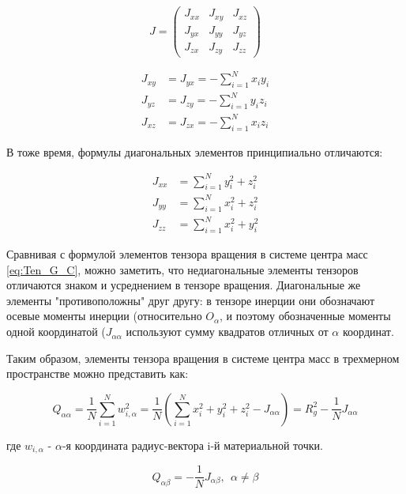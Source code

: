 \begin{equation}
\label{eq:Ten_I_J}
    J = \left(
    \begin{array}{ccc}
        J_{xx} & J_{xy} & J_{xz}  \\
        J_{yx} & J_{yy} & J_{yz} \\
        J_{zx} & J_{zy} & J_{zz}
    \end{array} \right)
\end{equation}

\begin{align}
    J_{xy} &= J_{yx} = -\sum_{i=1}^{N} x_{i} y_{i} \\
    J_{yz} &= J_{zy} = -\sum_{i=1}^{N} y_{i} z_{i} \\
    J_{xz} &= J_{zx} = -\sum_{i=1}^{N} x_{i} z_{i} 
\end{align}

В тоже время, формулы диагональных элементов принципиально отличаются:

\begin{align}
    J_{xx} &= \sum_{i=1}^{N} y_{i}^{2} + z_{i}^{2} \\
    J_{yy} &= \sum_{i=1}^{N} x_{i}^{2} + z_{i}^{2} \\
    J_{zz} &= \sum_{i=1}^{N} x_{i}^{2} + y_{i}^{2}
\end{align}

Сравнивая с формулой элементов тензора вращения в системе центра масс \eqref{eq:Ten_G_C}, можно заметить, что недиагональные элементы тензоров отличаются знаком и усреднением в тензоре вращения. Диагональные же элементы "противоположны" друг другу:
в тензоре инерции они обозначают осевые моменты инерции (относительно $O_{\alpha}$, и поэтому обозначенные моменты одной координатой ($J_{\alpha\alpha}$ используют сумму квадратов отличных от $\alpha$ координат.

Таким образом, элементы тензора вращения в системе центра масс в трехмерном пространстве можно представить как:

\begin{equation}
   Q_{\alpha\alpha} = \frac{1}{N}\sum^{N}_{i=1}w_{i,\alpha}^2 = \frac{1}{N} \left(\sum_{i=1}^{N}x_{i}^{2} + y_{i}^{2} + z_{i}^{2} - J_{\alpha\alpha}\right) = R^{2}_{g} - \frac{1}{N} J_{\alpha\alpha}  
\end{equation}

где $w_{i,\alpha}$ - $\alpha$-я координата радиус-вектора i-й материальной точки.

\begin{equation}
    Q_{\alpha\beta} = -\frac{1}{N} J_{\alpha\beta},\ \ \alpha \neq \beta
\end{equation}

